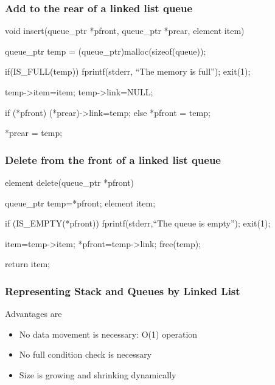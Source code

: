 \documentclass[newPxFont,sthlmFooter,nooffset]{beamer}
\begin{document}
\begin{frame}[t, fragile]
  \frametitle{Add to the rear of a linked list queue}
  \begin{ncodedef}
void insert(queue_ptr *pfront, 
            queue_ptr *prear, 
            element item) {
    queue_ptr temp = (queue_ptr)malloc(sizeof(queue));

    if(IS_FULL(temp)) {
        fprintf(stderr, ``The memory is full\n''); 
        exit(1);
    } 

    temp->item=item; 
    temp->link=NULL; 
    
    if (*pfront) 
        (*prear)->link=temp; 
    else
        *pfront = temp; 

    *prear = temp;
}    
  \end{ncodedef}
\end{frame}

\begin{frame}[t, fragile]
  \frametitle{Delete from the front of a linked list queue}
  \begin{ncodedef}
element delete(queue_ptr *pfront) { 
    queue_ptr temp=*pfront;
    element item;

    if (IS_EMPTY(*pfront)) {
        fprintf(stderr,``The queue is empty\n'');
        exit(1); 
    }

    item=temp->item; 
    *pfront=temp->link; 
    free(temp);

    return item;
}    
  \end{ncodedef}
\end{frame}

\begin{frame}[t]
  \frametitle{Representing Stack and Queues by Linked List}
Advantages are
\begin{itemize}
\item No data movement is necessary: O(1) operation
\item No full condition check is necessary
\item Size is growing and shrinking dynamically
\end{itemize}


\end{frame}
\end{document}
